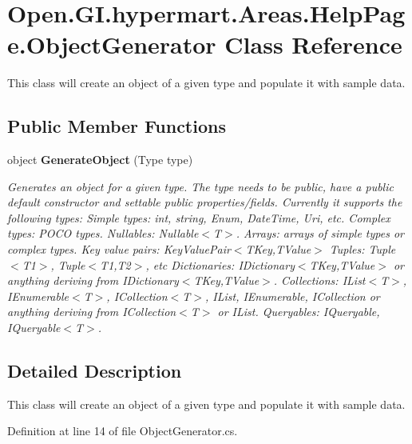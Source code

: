 \section{Open.\+G\+I.\+hypermart.\+Areas.\+Help\+Page.\+Object\+Generator Class Reference}
\label{class_open_1_1_g_i_1_1hypermart_1_1_areas_1_1_help_page_1_1_object_generator}


This class will create an object of a given type and populate it with sample data.  


\subsection*{Public Member Functions}
\begin{DoxyCompactItemize}
\item 
object \textbf{ Generate\+Object} (Type type)
\begin{DoxyCompactList}\small\item\em Generates an object for a given type. The type needs to be public, have a public default constructor and settable public properties/fields. Currently it supports the following types\+: Simple types\+: int, string, Enum, Date\+Time, Uri, etc. Complex types\+: P\+O\+CO types. Nullables\+: Nullable$<$\+T$>$. Arrays\+: arrays of simple types or complex types. Key value pairs\+: Key\+Value\+Pair$<$\+T\+Key,\+T\+Value$>$ Tuples\+: Tuple$<$\+T1$>$, Tuple$<$\+T1,\+T2$>$, etc Dictionaries\+: I\+Dictionary$<$\+T\+Key,\+T\+Value$>$ or anything deriving from I\+Dictionary$<$\+T\+Key,\+T\+Value$>$. Collections\+: I\+List$<$\+T$>$, I\+Enumerable$<$\+T$>$, I\+Collection$<$\+T$>$, I\+List, I\+Enumerable, I\+Collection or anything deriving from I\+Collection$<$\+T$>$ or I\+List. Queryables\+: I\+Queryable, I\+Queryable$<$\+T$>$. \end{DoxyCompactList}\end{DoxyCompactItemize}


\subsection{Detailed Description}
This class will create an object of a given type and populate it with sample data. 



Definition at line 14 of file Object\+Generator.\+cs.



